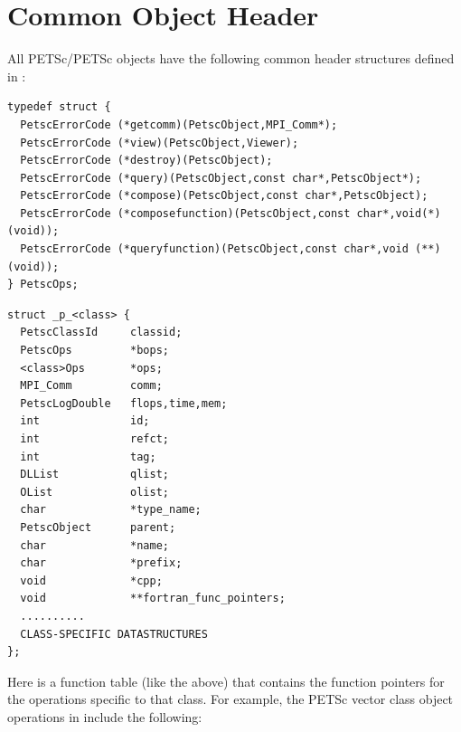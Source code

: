 \section{Common Object Header}

All PETSc/PETSc objects have the following common header structures
defined in \href{http://www.mcs.anl.gov/petsc/petsc-master/include/petsc/private/petscimpl.h.html}{}:

\begin{lstlisting}[caption=Function table common to all PETSc compatible classes]
typedef struct { 
  PetscErrorCode (*getcomm)(PetscObject,MPI_Comm*);
  PetscErrorCode (*view)(PetscObject,Viewer);
  PetscErrorCode (*destroy)(PetscObject);
  PetscErrorCode (*query)(PetscObject,const char*,PetscObject*);
  PetscErrorCode (*compose)(PetscObject,const char*,PetscObject);
  PetscErrorCode (*composefunction)(PetscObject,const char*,void(*)(void));
  PetscErrorCode (*queryfunction)(PetscObject,const char*,void (**)(void));
} PetscOps;
\end{lstlisting}
\begin{lstlisting}[caption=Data structure header common to all PETSc compatible classes]
struct _p_<class> {
  PetscClassId     classid;                                  
  PetscOps         *bops;                                   
  <class>Ops       *ops;                                    
  MPI_Comm         comm;                                    
  PetscLogDouble   flops,time,mem;                          
  int              id;                                      
  int              refct;                                   
  int              tag;                                     
  DLList           qlist;                                   
  OList            olist;                                   
  char             *type_name;                              
  PetscObject      parent;                                  
  char             *name;                                    
  char             *prefix;                                 
  void             *cpp;
  void             **fortran_func_pointers;       
  ..........
  CLASS-SPECIFIC DATASTRUCTURES
};
\end{lstlisting}
Here  is a function table (like the  above) that
contains the function pointers for the operations specific to that class.
For example, the PETSc vector class object operations in \href{http://www.mcs.anl.gov/petsc/petsc-master/include/petsc/private/vecimple.h.html}{} include the following:

